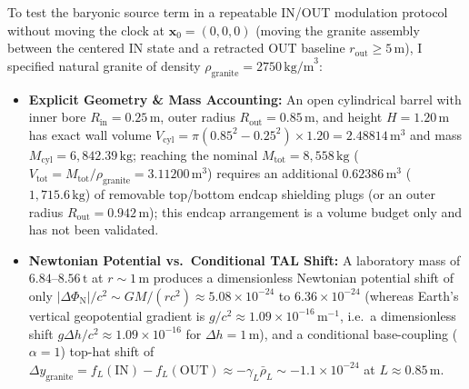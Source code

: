 \documentclass[10pt,a4paper]{article}
\begin{document}
\par
To test the baryonic source term in a repeatable IN/OUT modulation protocol without moving the clock at $\mathbf{x}_0 = (0,0,0)$ (moving the granite assembly between the centered IN state and a retracted OUT baseline $r_{\text{out}} \ge 5\,\text{m}$), I specified natural granite of density $\rho_{\text{granite}} = 2750\,\text{kg/m}^3$:
\begin{itemize}\setlength{\itemsep}{1pt}\setlength{\parskip}{0pt}\setlength{\topsep}{1pt}
  \item \textbf{Explicit Geometry \& Mass Accounting:} An open cylindrical barrel with inner bore $R_{\text{in}} = 0.25\,\text{m}$, outer radius $R_{\text{out}} = 0.85\,\text{m}$, and height $H = 1.20\,\text{m}$ has exact wall volume $V_{\text{cyl}} = \pi(0.85^2 - 0.25^2)\times 1.20 = 2.48814\,\text{m}^3$ and mass \textbf{$M_{\text{cyl}} = 6,842.39\,\text{kg}$}; reaching the nominal \textbf{$M_{\text{tot}} = 8,558\,\text{kg}$} ($V_{\text{tot}} = M_{\text{tot}}/\rho_{\text{granite}} = 3.11200\,\text{m}^3$) requires an additional $0.62386\,\text{m}^3$ ($1,715.6\,\text{kg}$) of removable top/bottom endcap shielding plugs (or an outer radius $R_{\text{out}} = 0.942\,\text{m}$); this endcap arrangement is a volume budget only and has not been validated.
  \item \textbf{Newtonian Potential vs.\ Conditional TAL Shift:} A laboratory mass of $6.84$--$8.56\,\text{t}$ at $r \sim 1\,\text{m}$ produces a dimensionless Newtonian potential shift of only $|\Delta\Phi_{\text{N}}|/c^2 \sim GM/(rc^2) \approx 5.08\times 10^{-24}$ to $6.36\times 10^{-24}$ (whereas Earth's vertical geopotential gradient is $g/c^2 \approx 1.09\times 10^{-16}\,\text{m}^{-1}$, i.e.\ a dimensionless shift $g\Delta h/c^2 \approx 1.09\times 10^{-16}$ for $\Delta h = 1\,\text{m}$), and a conditional base-coupling ($\alpha=1$) top-hat shift of $\Delta y_{\text{granite}} = f_L(\text{IN}) - f_L(\text{OUT}) \approx -\gamma_L\bar{\rho}_L \sim -1.1\times 10^{-24}$ at $L \approx 0.85\,\text{m}$.
\end{itemize}
\end{document}
